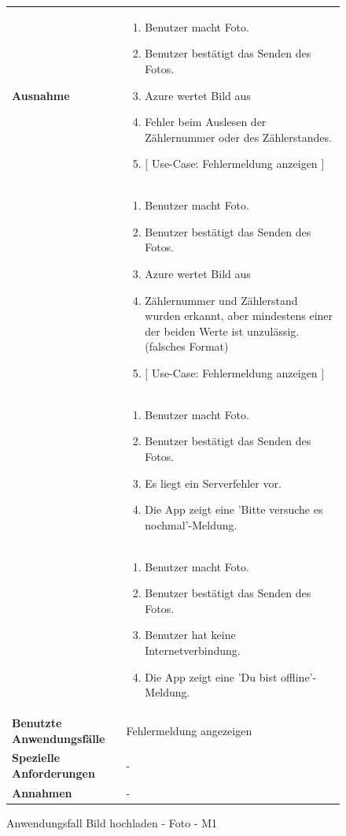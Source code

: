 \begin{figure}[h]
	\centering
	\begin{tabularx}{\textwidth}{ X | X }
	 \hline
		\textbf{Ausnahme} &
		\begin{enumerate}
			\item Benutzer macht Foto.
			\item Benutzer bestätigt das Senden des Fotos.
			\item Azure wertet Bild aus
			\item Fehler beim Auslesen der Zählernummer oder des Zählerstandes.
			\item $\lbrack$ Use-Case: Fehlermeldung anzeigen $\rbrack$
		\end{enumerate} \\ &
		\begin{enumerate}
			\item Benutzer macht Foto.
			\item Benutzer bestätigt das Senden des Fotos.
			\item Azure wertet Bild aus
			\item Zählernummer und Zählerstand wurden erkannt, aber mindestens einer der beiden Werte ist unzulässig. (falsches Format)
			\item $\lbrack$ Use-Case: Fehlermeldung anzeigen $\rbrack$
		\end{enumerate} \\  &
		\begin{enumerate}
			\item Benutzer macht Foto.
			\item Benutzer bestätigt das Senden des Fotos.
			\item Es liegt ein Serverfehler vor.
			\item Die App zeigt eine 'Bitte versuche es nochmal'-Meldung.
		\end{enumerate} \\  &
		\begin{enumerate}
			\item Benutzer macht Foto.
			\item Benutzer bestätigt das Senden des Fotos.
			\item Benutzer hat keine Internetverbindung.
			\item Die App zeigt eine 'Du bist offline'-Meldung.
		\end{enumerate} \\ \hline
		\textbf{Benutzte Anwendungsfälle} & Fehlermeldung angezeigen \\ \hline
		\textbf{Spezielle Anforderungen} & - \\ \hline
		\textbf{Annahmen} & -
	\end{tabularx}
	\caption{Anwendungsfall Bild hochladen - Foto - M1}
	\label{fig:anwendungsfall-server-tabelle-xx-1}
\end{figure}


